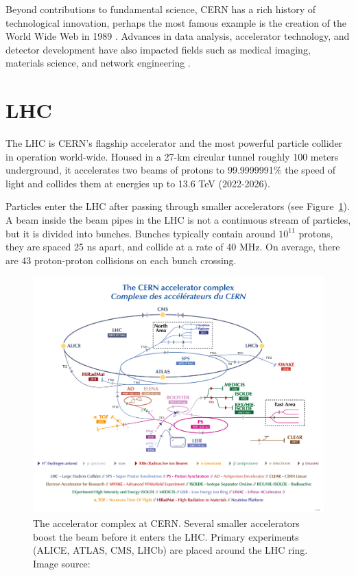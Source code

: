 Beyond contributions to fundamental science, \ac{CERN} has a rich history of technological innovation, perhaps the most famous example is the creation of the World Wide Web in 1989 \cite{www-proposal}. Advances in data analysis, accelerator technology, and detector development have also impacted fields such as medical imaging, materials science, and network engineering \cite{cern-tech-impact}.

\clearpage
\section{\acs{LHC}}
\label{sec:lhc-experiments}

The \ac{LHC} \cite{Lebrun:1284331, Brüning:782076} is \ac{CERN}'s flagship accelerator and the most powerful particle collider in operation world-wide. Housed in a 27-km circular tunnel roughly 100 meters underground, it accelerates two beams of protons to 99.9999991\% the speed of light and collides them at energies up to 13.6 \ac{TeV} (2022-2026).

Particles enter the \ac{LHC} after passing through smaller accelerators (see Figure~\ref{fig:cern-complex}). A beam inside the beam pipes in the \ac{LHC} is not a continuous stream of particles, but it is divided into bunches. Bunches typically contain around $10^{11}$ protons, they are spaced 25 ns apart, and collide at a rate of 40 MHz. On average, there are 43 proton-proton collisions on each bunch crossing.

\begin{figure}[htbp]
\centering
\includegraphics[width=\textwidth]{images/introduction/cern-experiments.png}
\caption[The accelerator complex at CERN]{The accelerator complex at \acs{CERN}. Several smaller accelerators boost the beam before it enters the \acs{LHC}. Primary experiments (\acs{ALICE}, \acs{ATLAS}, \acs{CMS}, \acs{LHCb}) are placed around the \acs{LHC} ring. Image source: \protect\cite{cern_accelerator_complex}}
\label{fig:cern-complex}
\end{figure}

